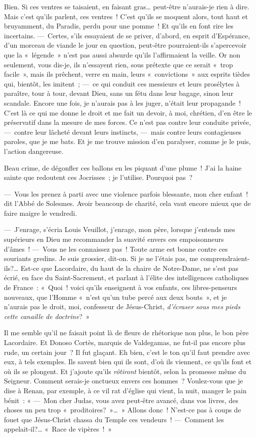 \documentclass[french,twoside]{book} %
\begin{document}
Bien. Si ces ventres se taisaient, en faisant   gras… peut-être n’aurais-je rien à dire. Mais c’est qu’ils parlent, ces ventres ! C’est qu’ils se moquent alors, tout haut et bruyamment, du Paradis, perdu pour une pomme ! Et qu’ils en font rire les incertains. — Certes, s’ils essayaient de se priver, d’abord, en esprit d’Espérance, d’un morceau de viande le jour en question, peut-être pourraient-ils s’apercevoir que la « légende » n’est pas aussi absurde qu’ils l’affirmaient la veille. Or non seulement, vous dis-je, ils n’essayent rien, sous prétexte que ce serait « trop facile », mais ils prêchent, verre en main, leurs « convictions » aux esprits tièdes qui, bientôt, les imitent ; — ce qui conduit ces messieurs et leurs prosélytes à paraître, tour à tour, devant Dieu, sans un fétu dans leur bagage, sinon leur scandale. Encore une fois, je n’aurais pas à les juger, n’était leur propagande ! C’est là ce qui me donne le droit et me fait un devoir, à moi, chrétien, d’en être le préservatif dans la mesure de mes forces. Ce n’est pas contre leur conduite privée, — contre leur lâcheté devant leurs instincts, — mais contre leurs contagieuses   paroles, que je me bats. Et je me trouve mission d’en paralyser, comme je le puis, l’action dangereuse.\par
Beau crime, de dégonfler ces ballons en les piquant d’une plume ! J’ai la haine sainte que redoutent ces Jocrisses ; je l’utilise. Pourquoi pas ?\par
— Vous les prenez à parti avec une violence parfois blessante, mon cher enfant ! dit l’Abbé de Solesmes. Avoir beaucoup de charité, cela vaut encore mieux que de faire maigre le vendredi.\par
— J’enrage, s’écria Louis Veuillot, j’enrage, mon père, lorsque j’entends mes supérieurs en Dieu me recommander la suavité envers ces empoisonneurs d’âmes ! — Vous ne les connaissez pas ! Toute arme est bonne contre ces souriants gredins. Je suis grossier, dit-on. Si je ne l’étais pas, me comprendraient-ils?… Est-ce que Lacordaire, du haut de la chaire de Notre-Dame, ne s’est pas écrié, en face du Saint-Sacrement, et parlant à l’élite des intelligences catholiques de France : « Quoi ! voici qu’ils enseignent à vos   enfants, ces libres-penseurs nouveaux, que l’Homme « n’est qu’un tube percé aux deux bouts », et je n’aurais pas le droit, moi, confesseur de Jésus-Christ, \emph{d’écraser sous mes pieds cette canaille de doctrine}? »\par
Il me semble qu’il ne faisait point là de fleurs de rhétorique non plus, le bon père Lacordaire. Et Donoso Cortès, marquis de Valdegamas, ne fut-il pas encore plus rude, un certain jour ? Il fut glaçant. Eh bien, c’est le ton qu’il faut prendre avec eux, à tels exemples. Ils savent bien qui ils sont, d’où ils viennent, ce qu’ils font et où ils se plongent. Et j’ajoute qu’ils \emph{rôtiront} bientôt, selon la promesse même du Seigneur. Comment serais-je onctueux envers ces hommes ? Voulez-vous que je dise à Renan, par exemple, à ce vil rat d’église qui vient, la nuit, manger le pain bénit : « — Mon cher Judas, vous avez peut-être avancé, dans vos livres, des choses un peu trop « proditoires? »… » Allons donc ! N’est-ce pas à coups de fouet que Jésus-Christ chassa du Temple ces vendeurs ! — Comment les appelait-il?… « Race de vipères ! »\par
\end{document}
